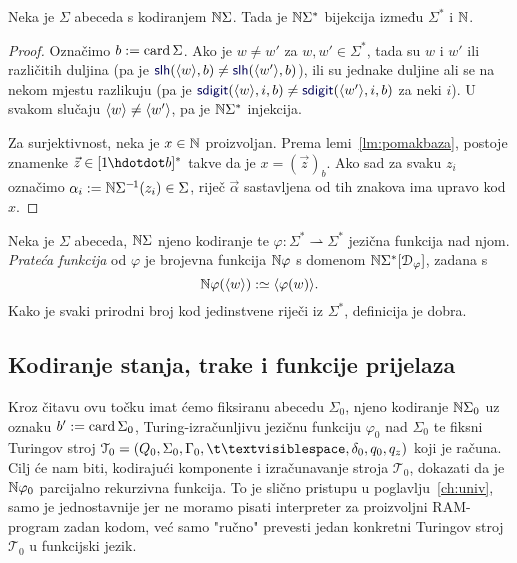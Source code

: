 \begin{propozicija}[{name=[bijektivnost kodiranja riječi]}]\label{pp:bijkr}
Neka je $\Sigma$ abeceda s kodiranjem ${\mathbb N}\Sigma$.
    Tada je ${\mathbb N}\Sigma^*$ bijekcija između $\Sigma^*$ i ${\mathbb N}$.
\end{propozicija}
\begin{proof}
Označimo $b:=\operatorname{card}\Sigma$. Ako je $w\ne w'$ za $w,w'\in\Sigma^*$, tada su $w$ i $w'$ ili različitih duljina (pa je $\f{slh}(\kr w,b)\ne\f{slh}(\kr{w'},b)$), ili su jednake duljine ali se na nekom mjestu razlikuju (pa je $\f{sdigit}(\kr w,i,b)\ne\f{sdigit}(\kr{w'},i,b)$ za neki $i$).
U svakom slučaju $\langle w\rangle\ne\langle w'\rangle$, pa je ${\mathbb N}\Sigma^*$ injekcija.

	Za surjektivnost, neka je $x\in{\mathbb N}$ proizvoljan. Prema lemi~\ref{lm:pomakbaza}, postoje znamenke $\vec z\in[1\mspace{-1mu}\dd b]^*$ takve da je $x=(\vec z)_b$. Ako sad za svaku $z_i$ označimo $\alpha_i:={\mathbb N}\Sigma^{-\mspace{-2mu}1}(z_i)\in\Sigma$, riječ $\vec\alpha$ sastavljena od tih znakova ima upravo kod $x$.
\end{proof}


\begin{definicija}[{name=[prateća funkcija jezične funkcije]}]\label{def:kodfi}
Neka je $\Sigma$ abeceda, ${\mathbb N}\Sigma$ njeno kodiranje te $\varphi:\Sigma^*\rightharpoonup\Sigma^*$ jezična funkcija nad njom. \emph{Prateća funkcija} od $\varphi$ je brojevna funkcija ${\mathbb N}\varphi$ s domenom ${\mathbb N}\Sigma^*[\mathcal D_{\varphi}]$, zadana s
\begin{equation}\label{eq:kodfidef}
    {\mathbb N}\varphi(\langle w\rangle):\simeq\langle\varphi(w)\rangle\text.
\end{equation}
Kako je svaki prirodni broj kod jedinstvene riječi iz $\Sigma^*$, definicija je dobra.
\end{definicija}

\subsection{Kodiranje stanja, trake i funkcije prijelaza}

Kroz čitavu ovu točku imat ćemo fiksiranu abecedu $\Sigma_0$, njeno kodiranje ${\mathbb N}\Sigma_0$ uz oznaku $b':=\operatorname{card}\Sigma_0$, Turing-izračunljivu jezičnu funkciju $\varphi_0$ nad $\Sigma_0$ te fiksni Turingov stroj $\mathcal T_0=(Q_0,\Sigma_0,\Gamma_0,\bl,\delta_0,q_0,q_z)$ koji je računa. Cilj će nam biti, kodirajući komponente i izračunavanje stroja $\mathcal T_0$, dokazati da je ${\mathbb N}\varphi_0$ parcijalno rekurzivna funkcija. To je slično pristupu u poglavlju~\ref{ch:univ}, samo je jednostavnije jer ne moramo pisati interpreter za proizvoljni RAM-program zadan kodom, već samo "ručno" prevesti jedan konkretni Turingov stroj $\mathcal T_0$ u funkcijski jezik.

